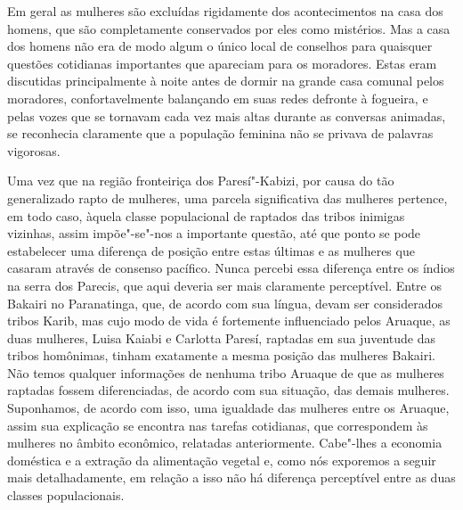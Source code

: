 
Em geral as mulheres são excluídas rigidamente dos acontecimentos na
casa dos homens, que são completamente conservados por eles como
mistérios. Mas a casa dos homens não era de modo algum o único local de
conselhos para quaisquer questões cotidianas importantes que apareciam
para os moradores. Estas eram discutidas principalmente à noite antes de
dormir na grande casa comunal pelos moradores, confortavelmente
balançando em suas redes defronte à fogueira, e pelas vozes que se
tornavam cada vez mais altas durante as conversas animadas, se
reconhecia claramente que a população feminina não se privava de
palavras vigorosas.

Uma vez que na região fronteiriça dos Paresí"-Kabizi, por causa do tão
generalizado rapto de mulheres, uma parcela significativa das mulheres
pertence, em todo caso, àquela classe populacional de raptados das
tribos inimigas vizinhas, assim impõe"-se"-nos a importante questão, até
que ponto se pode estabelecer uma diferença de posição entre estas
últimas e as mulheres que casaram através de consenso pacífico. Nunca
percebi essa diferença entre os índios na serra dos Parecis, que aqui
deveria ser mais claramente perceptível. Entre os Bakairi no
Paranatinga, que, de acordo com sua língua, devam ser considerados
tribos Karib, mas cujo modo de vida é fortemente influenciado pelos
Aruaque, as duas mulheres, Luisa Kaiabi e Carlotta Paresí, raptadas em
sua juventude das tribos homônimas, tinham exatamente a mesma posição
das mulheres Bakairi. Não temos qualquer informações de nenhuma tribo
Aruaque de que as mulheres raptadas fossem diferenciadas, de acordo com
sua situação, das demais mulheres. Suponhamos, de acordo com isso, uma
igualdade das mulheres entre os Aruaque, assim sua explicação se
encontra nas tarefas cotidianas, que correspondem às mulheres no âmbito
econômico, relatadas anteriormente. Cabe"-lhes a economia doméstica e a
extração da alimentação vegetal e, como nós exporemos a seguir mais
detalhadamente, em relação a isso não há diferença perceptível entre as
duas classes populacionais.

